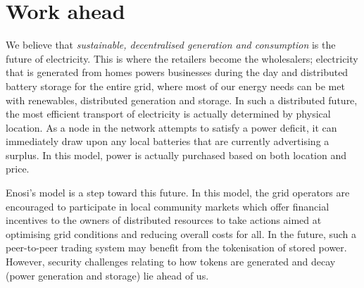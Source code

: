 \documentclass[a4paper,12pt,reqno]{amsart}
\theoremstyle{definition}
\begin{document}



\newpage


\section*{Work ahead}

We believe that \textit{sustainable, decentralised generation and consumption} is the future of electricity. This is where the retailers become the wholesalers; electricity that is generated from homes powers businesses during the day and distributed battery storage for the entire grid, where most of our energy needs can be met with renewables, distributed generation and storage. In such a distributed future, the most efficient transport of electricity is actually determined by physical location. As a node in the network attempts to satisfy a power deficit, it can immediately draw upon any local batteries that are currently advertising a surplus. In this model, power is actually purchased based on both location and price.


Enosi's model is a step toward this future. In this model, the grid operators are encouraged to participate in local community markets which offer financial incentives to the owners of distributed resources to take actions aimed at optimising grid conditions and reducing overall costs for all. In the future, such a peer-to-peer trading system may benefit from the tokenisation of stored power. However, security challenges relating to how tokens are generated and decay (power generation and storage) lie ahead of us.
\end{document}

